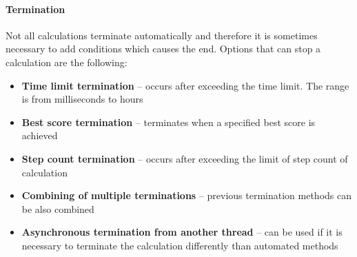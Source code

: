 \paragraph{Termination}
Not all calculations terminate automatically and therefore it is sometimes necessary to add conditions which causes the end. Options that can stop a calculation are the following:

\begin{itemize}
\item \textbf{Time limit termination} -- occurs after exceeding the time limit. The range is from milliseconds to hours
\item \textbf{Best score termination} -- terminates when a specified best score is achieved
\item \textbf{Step count termination} -- occurs after exceeding the limit of step count of calculation
\item \textbf{Combining of multiple terminations} -- previous termination methods can be also combined
\item \textbf{Asynchronous termination from another thread} -- can be used if it is necessary to terminate the calculation differently than automated methods
\end{itemize}

